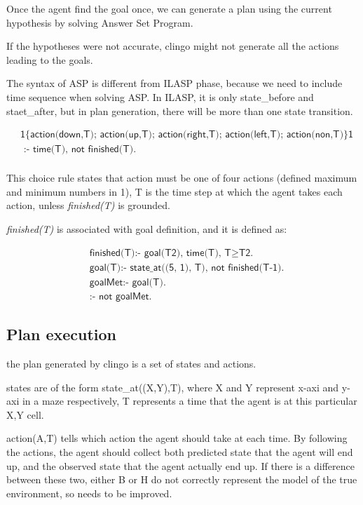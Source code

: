 Once the agent find the goal once, we can generate a plan using the current hypothesis by solving Answer Set Program. 

If the hypotheses were not accurate, clingo might not generate all the actions leading to the goals. 

The syntax of ASP is different from ILASP phase, because we need to include time sequence when solving ASP.
In ILASP, it is only state\_before and staet\_after, but in plan generation, there will be more than one state transition. 

\begin{equation}
\begin{split}
&\textsf{1\{action(down,T); action(up,T); action(right,T); action(left,T); action(non,T)\}1} \\
&\textsf{ :- time(T), not finished(T).}\\
\end{split}
\end{equation}

This choice rule states that action must be one of four actions (defined maximum and minimum numbers in 1), 
T is the time step at which the agent takes each action, unless \textit{finished(T)} is grounded. 

\textit{finished(T)} is associated with goal definition, and it is defined as:

\begin{equation}
\begin{split}
&\textsf{finished(T):- goal(T2), time(T), T} \geq \textsf{T2.}\\
&\textsf{goal(T):- state\_at((5, 1), T), not finished(T-1).}\\
&\textsf{goalMet:- goal(T).}\\
&\textsf{:- not goalMet.}
\end{split}
\end{equation}
    

\subsection{Plan execution}
\label{Plan execution}

the plan generated by clingo is a set of states and actions. 

states are of the form state\_at((X,Y),T), where X and Y represent x-axi and y-axi in a maze respectively, T represents a time that the agent is at 
this particular X,Y cell. 

action(A,T) tells which action the agent should take at each time. By following the actions, the agent should collect both predicted state that the 
agent will end up, and the observed state that the agent actually end up. If there is a difference between these two, either B or H do not correctly represent
the model of the true environment, so needs to be improved. 

